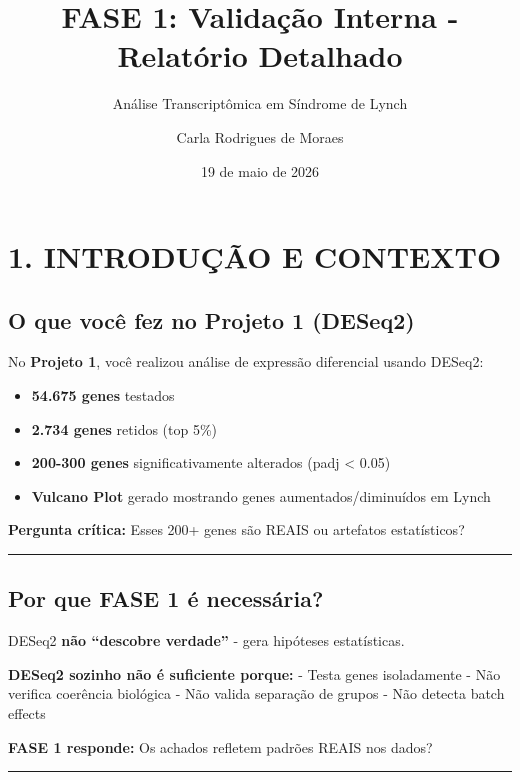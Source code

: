 \documentclass[
]{article}
\title{FASE 1: Validação Interna - Relatório Detalhado}
\subtitle{Análise Transcriptômica em Síndrome de Lynch}
\author{Carla Rodrigues de Moraes}
\date{19 de maio de 2026}
\providecommand{\tightlist}{%
  \setlength{\itemsep}{0pt}\setlength{\parskip}{0pt}}
\begin{document}
\maketitle

{
\setcounter{tocdepth}{3}
\tableofcontents
}
\section{1. INTRODUÇÃO E CONTEXTO}\label{introduuxe7uxe3o-e-contexto}

\subsection{O que você fez no Projeto 1
(DESeq2)}\label{o-que-vocuxea-fez-no-projeto-1-deseq2}

No \textbf{Projeto 1}, você realizou análise de expressão diferencial
usando DESeq2:

\begin{itemize}
\tightlist
\item
  \textbf{54.675 genes} testados
\item
  \textbf{2.734 genes} retidos (top 5\%)
\item
  \textbf{200-300 genes} significativamente alterados (padj \textless{}
  0.05)
\item
  \textbf{Vulcano Plot} gerado mostrando genes aumentados/diminuídos em
  Lynch
\end{itemize}

\textbf{Pergunta crítica:} Esses 200+ genes são REAIS ou artefatos
estatísticos?

\begin{center}\rule{0.5\linewidth}{0.5pt}\end{center}

\subsection{Por que FASE 1 é
necessária?}\label{por-que-fase-1-uxe9-necessuxe1ria}

DESeq2 \textbf{não ``descobre verdade''} - gera hipóteses estatísticas.

\textbf{DESeq2 sozinho não é suficiente porque:} - Testa genes
isoladamente - Não verifica coerência biológica - Não valida separação
de grupos - Não detecta batch effects

\textbf{FASE 1 responde:} Os achados refletem padrões REAIS nos dados?

\begin{center}\rule{0.5\linewidth}{0.5pt}\end{center}
\end{document}
